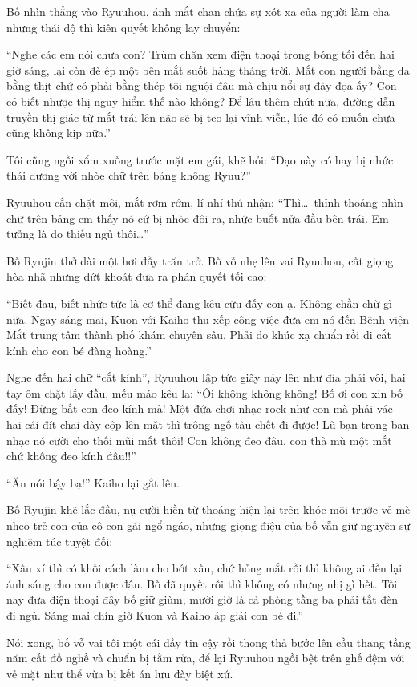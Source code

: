 ﻿\documentclass[../main.tex]{subfiles}
\begin{document}
Bố nhìn thẳng vào Ryuuhou, ánh mắt chan chứa sự xót xa của người làm cha nhưng thái độ thì kiên quyết không lay chuyển:

``Nghe các em nói chưa con? Trùm chăn xem điện thoại trong bóng tối đến hai giờ sáng, lại còn đè ép một bên mắt suốt hàng tháng trời. Mắt con người bằng da bằng thịt chứ có phải bằng thép tôi nguội đâu mà chịu nổi sự đày đọa ấy? Con có biết nhược thị nguy hiểm thế nào không? Để lâu thêm chút nữa, đường dẫn truyền thị giác từ mắt trái lên não sẽ bị teo lại vĩnh viễn, lúc đó có muốn chữa cũng không kịp nữa.''

Tôi cũng ngồi xổm xuống trước mặt em gái, khẽ hỏi: ``Dạo này có hay bị nhức thái dương với nhòe chữ trên bảng không Ryuu?''

Ryuuhou cắn chặt môi, mắt rơm rớm, lí nhí thú nhận: ``Thì\dots\ thỉnh thoảng nhìn chữ trên bảng em thấy nó cứ bị nhòe đôi ra, nhức buốt nửa đầu bên trái. Em tưởng là do thiếu ngủ thôi\dots''

Bố Ryujin thở dài một hơi đầy trăn trở. Bố vỗ nhẹ lên vai Ryuuhou, cất giọng hòa nhã nhưng dứt khoát đưa ra phán quyết tối cao:

``Biết đau, biết nhức tức là cơ thể đang kêu cứu đấy con ạ. Không chần chừ gì nữa. Ngay sáng mai, Kuon với Kaiho thu xếp công việc đưa em nó đến Bệnh viện Mắt trung tâm thành phố khám chuyên sâu. Phải đo khúc xạ chuẩn rồi đi cắt kính cho con bé đàng hoàng.''

Nghe đến hai chữ ``cắt kính'', Ryuuhou lập tức giãy nảy lên như đỉa phải vôi, hai tay ôm chặt lấy đầu, mếu máo kêu la: ``Ôi không không không! Bố ơi con xin bố đấy! Đừng bắt con đeo kính mà! Một đứa chơi nhạc rock như con mà phải vác hai cái đít chai dày cộp lên mặt thì trông ngố tàu chết đi được! Lũ bạn trong ban nhạc nó cười cho thối mũi mất thôi! Con không đeo đâu, con thà mù một mắt chứ không đeo kính đâu!!''

``Ăn nói bậy bạ!'' Kaiho lại gắt lên.

Bố Ryujin khẽ lắc đầu, nụ cười hiền từ thoáng hiện lại trên khóe môi trước vẻ mè nheo trẻ con của cô con gái ngổ ngáo, nhưng giọng điệu của bố vẫn giữ nguyên sự nghiêm túc tuyệt đối:

``Xấu xí thì có khối cách làm cho bớt xấu, chứ hỏng mắt rồi thì không ai đền lại ánh sáng cho con được đâu. Bố đã quyết rồi thì không có nhưng nhị gì hết. Tối nay đưa điện thoại đây bố giữ giùm, mười giờ là cả phòng tầng ba phải tắt đèn đi ngủ. Sáng mai chín giờ Kuon và Kaiho áp giải con bé đi.''

Nói xong, bố vỗ vai tôi một cái đầy tin cậy rồi thong thả bước lên cầu thang tầng năm cất đồ nghề và chuẩn bị tắm rửa, để lại Ryuuhou ngồi bệt trên ghế đệm với vẻ mặt như thể vừa bị kết án lưu đày biệt xứ.
\end{document}
